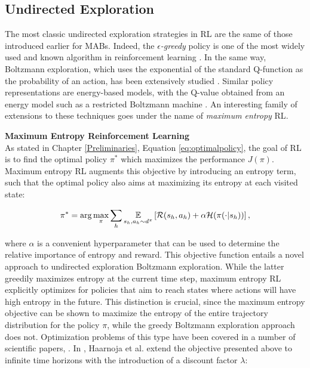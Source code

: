 \subsection{Undirected Exploration}
The most classic undirected exploration strategies in \gls{RL} are the same of those introduced earlier for \gls{MAB}s. Indeed, the $\epsilon$\emph{-greedy} policy is one of the most widely used and known algorithm in reinforcement learning \cite{sutton2018reinforcement}. In the same way, Boltzmann exploration, which uses the exponential of the
standard Q-function as the probability of an action, has been extensively studied \cite{thrun1992efficient, cesa2017boltzmann}. Similar policy representations are energy-based models, with
the Q-value obtained from an energy model such as a restricted Boltzmann machine \cite{sallans2004reinforcement}. An interesting family of extensions to these techniques goes under the name of \emph{maximum entropy} \gls{RL}.

\textbf{Maximum Entropy Reinforcement Learning} \\
As stated in Chapter \ref{Preliminaries}, Equation \ref{eq:optimalpolicy}, the goal of \gls{RL} is to find the optimal policy $\pi^*$ which maximizes the performance $J(\pi)$. Maximum entropy \gls{RL} augments this objective by introducing an entropy term, such that the optimal policy also aims at maximizing its entropy at each visited state:

\begin{align}
\pi^*=\arg\max_\pi\sum_h\underset{s_h,a_h\sim d^{\pi}}{\mathbb{E}}\left[{\mathcal{R}(s_h,a_h)+\alpha\mathcal{H}(\pi(\cdot|s_h))}\right],
\end{align}

where $\alpha$ is a convenient hyperparameter that can be used to determine the relative importance of entropy and reward. This objective function entails a novel approach to undirected exploration \wrt Boltzmann  exploration. While the latter greedily maximizes entropy at the current time step, maximum entropy \gls{RL} explicitly optimizes for policies that aim to reach states where actions will have high entropy in the future. This distinction is crucial, since the maximum entropy objective can be shown to maximize the entropy of the entire trajectory distribution for the policy $\pi$, while the greedy Boltzmann exploration approach does not. Optimization problems of this type have been covered in a number of scientific papers, \eg \cite{ziebart2008maximum, haarnoja2017reinforcement, haarnoja2018soft}. In \cite{haarnoja2017reinforcement}, Haarnoja et al. extend the objective presented above to infinite time horizons with the introduction of a discount factor $\lambda$:


